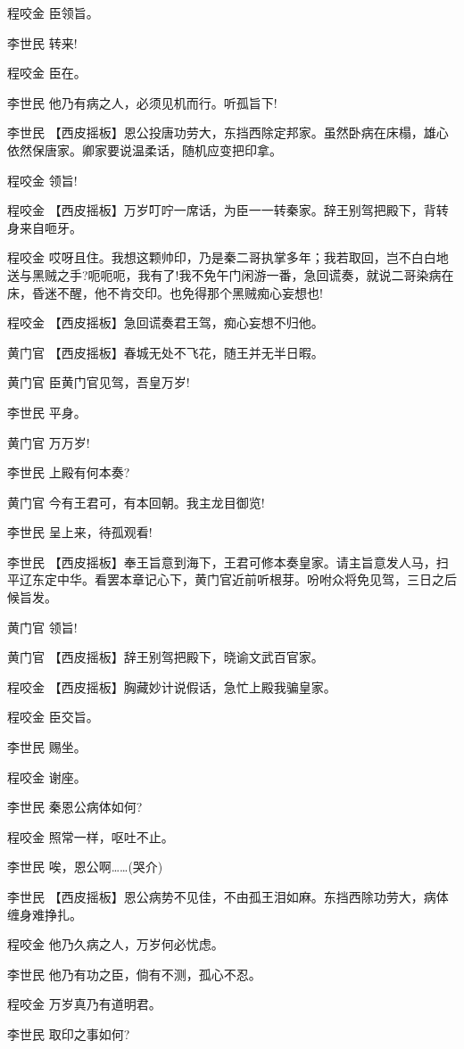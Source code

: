 程咬金 臣领旨。

李世民 转来!

程咬金 臣在。

李世民 他乃有病之人，必须见机而行。听孤旨下!

李世民
【西皮摇板】恩公投唐功劳大，东挡西除定邦家。虽然卧病在床榻，雄心依然保唐家。卿家要说温柔话，随机应变把印拿。

程咬金 领旨!

程咬金
【西皮摇板】万岁叮咛一席话，为臣一一转秦家。辞王别驾把殿下，背转身来自咂牙。

程咬金
哎呀且住。我想这颗帅印，乃是秦二哥执掌多年；我若取回，岂不白白地送与黑贼之手?呃呃呃，我有了!我不免午门闲游一番，急回谎奏，就说二哥染病在床，昏迷不醒，他不肯交印。也免得那个黑贼痴心妄想也!

程咬金 【西皮摇板】急回谎奏君王驾，痴心妄想不归他。

黄门官 【西皮摇板】春城无处不飞花，随王并无半日暇。

黄门官 臣黄门官见驾，吾皇万岁!

李世民 平身。

黄门官 万万岁!

李世民 上殿有何本奏?

黄门官 今有王君可，有本回朝。我主龙目御览!

李世民 呈上来，待孤观看!

李世民
【西皮摇板】奉王旨意到海下，王君可修本奏皇家。请主旨意发人马，扫平辽东定中华。看罢本章记心下，黄门官近前听根芽。吩咐众将免见驾，三日之后候旨发。

黄门官 领旨!

黄门官 【西皮摇板】辞王别驾把殿下，晓谕文武百官家。

程咬金 【西皮摇板】胸藏妙计说假话，急忙上殿我骗皇家。

程咬金 臣交旨。

李世民 赐坐。

程咬金 谢座。

李世民 秦恩公病体如何?

程咬金 照常一样，呕吐不止。

李世民 唉，恩公啊\ldots{}\ldots{}(哭介)

李世民
【西皮摇板】恩公病势不见佳，不由孤王泪如麻。东挡西除功劳大，病体缠身难挣扎。

程咬金 他乃久病之人，万岁何必忧虑。

李世民 他乃有功之臣，倘有不测，孤心不忍。

程咬金 万岁真乃有道明君。

李世民 取印之事如何?

